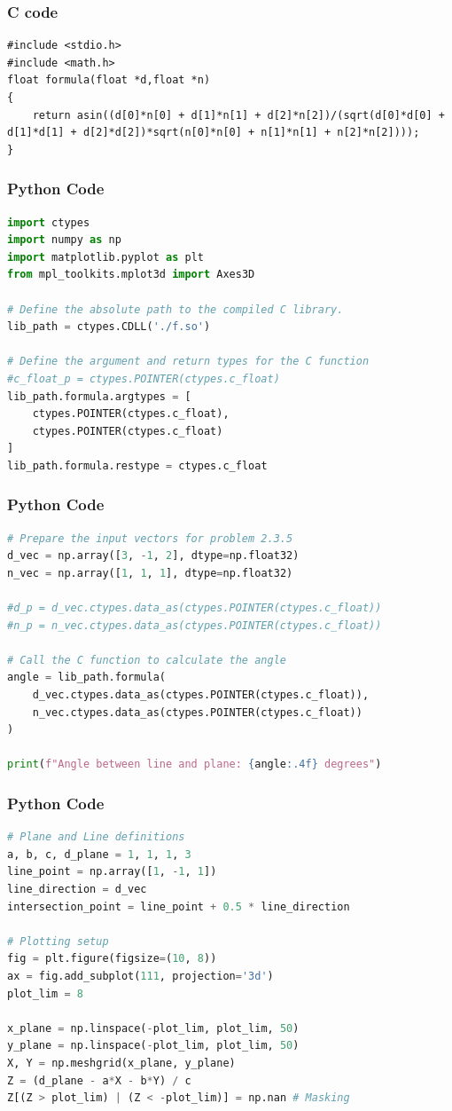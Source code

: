 \documentclass{beamer}
\begin{document}
\begin{frame}[fragile]
    \frametitle{C code}
    \begin{lstlisting}
#include <stdio.h>
#include <math.h>
float formula(float *d,float *n)
{
    return asin((d[0]*n[0] + d[1]*n[1] + d[2]*n[2])/(sqrt(d[0]*d[0] + d[1]*d[1] + d[2]*d[2])*sqrt(n[0]*n[0] + n[1]*n[1] + n[2]*n[2])));
}
    \end{lstlisting}
\end{frame}

\begin{frame}[fragile]
    \frametitle{Python Code}
    \begin{lstlisting}[language=Python]
import ctypes
import numpy as np
import matplotlib.pyplot as plt
from mpl_toolkits.mplot3d import Axes3D

# Define the absolute path to the compiled C library.
lib_path = ctypes.CDLL('./f.so')

# Define the argument and return types for the C function
#c_float_p = ctypes.POINTER(ctypes.c_float)
lib_path.formula.argtypes = [
    ctypes.POINTER(ctypes.c_float),
    ctypes.POINTER(ctypes.c_float)
]
lib_path.formula.restype = ctypes.c_float
    \end{lstlisting}
\end{frame}

\begin{frame}[fragile]
    \frametitle{Python Code}
    \begin{lstlisting}[language=Python]
# Prepare the input vectors for problem 2.3.5
d_vec = np.array([3, -1, 2], dtype=np.float32)
n_vec = np.array([1, 1, 1], dtype=np.float32)

#d_p = d_vec.ctypes.data_as(ctypes.POINTER(ctypes.c_float))
#n_p = n_vec.ctypes.data_as(ctypes.POINTER(ctypes.c_float))

# Call the C function to calculate the angle
angle = lib_path.formula(
    d_vec.ctypes.data_as(ctypes.POINTER(ctypes.c_float)),
    n_vec.ctypes.data_as(ctypes.POINTER(ctypes.c_float))
)

print(f"Angle between line and plane: {angle:.4f} degrees")
    \end{lstlisting}
\end{frame}

\begin{frame}[fragile]
    \frametitle{Python Code}
    \begin{lstlisting}[language=Python]
# Plane and Line definitions
a, b, c, d_plane = 1, 1, 1, 3 
line_point = np.array([1, -1, 1])
line_direction = d_vec
intersection_point = line_point + 0.5 * line_direction

# Plotting setup
fig = plt.figure(figsize=(10, 8))
ax = fig.add_subplot(111, projection='3d')
plot_lim = 8

x_plane = np.linspace(-plot_lim, plot_lim, 50)
y_plane = np.linspace(-plot_lim, plot_lim, 50)
X, Y = np.meshgrid(x_plane, y_plane)
Z = (d_plane - a*X - b*Y) / c
Z[(Z > plot_lim) | (Z < -plot_lim)] = np.nan # Masking
    \end{lstlisting}
\end{frame}
\end{document}
